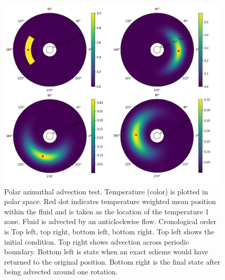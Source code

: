 \documentclass{article}
\begin{document}
\begin{figure}[h!]
	\centering
	\includegraphics{polarPeriodic/PolarPeriodicFigure.jpg}
	\caption{Polar azimuthal advection test. Temperature (color) is plotted in polar space. Red dot indicates temperature weighted mean position within 
	the fluid and is taken as the location of the temperature 1 zone. Fluid is advected by an anticlockwise flow. Cronological order is Top left, top right, bottom left, bottom right. Top left shows the initial condition. Top right shows advection across periodic boundary. Bottom left is state when an exact scheme would have returned to the original position. Bottom right is the final state after being advected around one rotation.}
	\label{polar periodic advection}
\end{figure}
\end{document}
